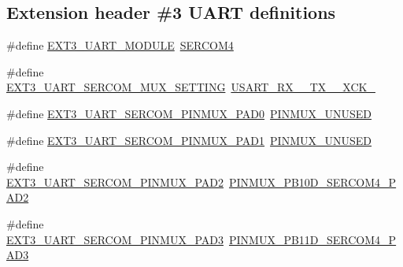 \subsection*{Extension header \#3 U\+A\+RT definitions}
\begin{DoxyCompactItemize}
\item 
\#define \mbox{\hyperlink{group__samd21__xplained__pro__features__group_ga4ba0c912918abec0687a93e135e0c1ba}{E\+X\+T3\+\_\+\+U\+A\+R\+T\+\_\+\+M\+O\+D\+U\+LE}}~\mbox{\hyperlink{group___s_a_m_d21_j18_a__base_gad48343faa88820b8f552aa1eaf66f00a}{S\+E\+R\+C\+O\+M4}}
\item 
\#define \mbox{\hyperlink{group__samd21__xplained__pro__features__group_gab85f72ec57420f2ca281dc8ec8200888}{E\+X\+T3\+\_\+\+U\+A\+R\+T\+\_\+\+S\+E\+R\+C\+O\+M\+\_\+\+M\+U\+X\+\_\+\+S\+E\+T\+T\+I\+NG}}~\mbox{\hyperlink{group__asfdoc__sam0__sercom__usart__group_gga87bbdb9f7edb3f1866aeb498bf7c9077a026e9eb10b4f94b2a0e5640a9fe22544}{U\+S\+A\+R\+T\+\_\+\+R\+X\+\_\+\_\+\+T\+X\+\_\+\_\+\+X\+C\+K\+\_}}
\item 
\#define \mbox{\hyperlink{group__samd21__xplained__pro__features__group_gada3e8c4dfcbb8ea29ae7582dacb413bd}{E\+X\+T3\+\_\+\+U\+A\+R\+T\+\_\+\+S\+E\+R\+C\+O\+M\+\_\+\+P\+I\+N\+M\+U\+X\+\_\+\+P\+A\+D0}}~\mbox{\hyperlink{group__asfdoc__sam0__sercom__usart__group_gaffde9ff712058ef836127e1f3368889e}{P\+I\+N\+M\+U\+X\+\_\+\+U\+N\+U\+S\+ED}}
\item 
\#define \mbox{\hyperlink{group__samd21__xplained__pro__features__group_ga35fab6527496eabe2c5f7b6a4a80556a}{E\+X\+T3\+\_\+\+U\+A\+R\+T\+\_\+\+S\+E\+R\+C\+O\+M\+\_\+\+P\+I\+N\+M\+U\+X\+\_\+\+P\+A\+D1}}~\mbox{\hyperlink{group__asfdoc__sam0__sercom__usart__group_gaffde9ff712058ef836127e1f3368889e}{P\+I\+N\+M\+U\+X\+\_\+\+U\+N\+U\+S\+ED}}
\item 
\#define \mbox{\hyperlink{group__samd21__xplained__pro__features__group_ga3b425f4905c877a78674ca26aa08833b}{E\+X\+T3\+\_\+\+U\+A\+R\+T\+\_\+\+S\+E\+R\+C\+O\+M\+\_\+\+P\+I\+N\+M\+U\+X\+\_\+\+P\+A\+D2}}~\mbox{\hyperlink{pio_2samd21j18a_8h_a53d5142f66d9424585852a343ed0b204}{P\+I\+N\+M\+U\+X\+\_\+\+P\+B10\+D\+\_\+\+S\+E\+R\+C\+O\+M4\+\_\+\+P\+A\+D2}}
\item 
\#define \mbox{\hyperlink{group__samd21__xplained__pro__features__group_gac8ad1efc6a16fd80d227082ebc261a03}{E\+X\+T3\+\_\+\+U\+A\+R\+T\+\_\+\+S\+E\+R\+C\+O\+M\+\_\+\+P\+I\+N\+M\+U\+X\+\_\+\+P\+A\+D3}}~\mbox{\hyperlink{pio_2samd21j18a_8h_a944d81810295acdef84b694e06282dde}{P\+I\+N\+M\+U\+X\+\_\+\+P\+B11\+D\+\_\+\+S\+E\+R\+C\+O\+M4\+\_\+\+P\+A\+D3}}

\end{DoxyCompactItemize}
